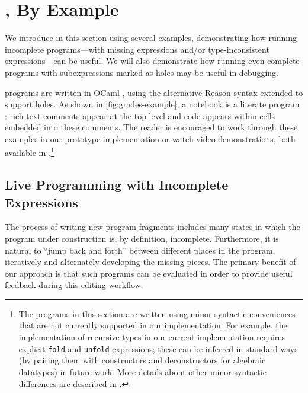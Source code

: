\newcommand{\examplesSec}{\HazelnutLive, By Example}
\section{\protect\examplesSec} %
\label{sec:examples}

\newcommand{\overviewExample}[2]{\paragraph{Example {#1}: {#2}}}

We introduce \HazelnutLive{} in this section using several examples,
demonstrating how running incomplete programs---with missing expressions and/or
type-inconsistent expressions---can be useful.
%
We will also demonstrate how running even complete programs with subexpressions
marked as holes may be useful in debugging.

\HazelnutLive{} programs are written in OCaml \cite{leroy03:_ocaml}, using the
alternative Reason syntax \cite{reason-what} extended to support holes.
%
As shown in \autoref{fig:grades-example}, a \HazelnutLive{} notebook is a
literate program \cite{knuth1984literate}: rich text comments appear at the top
level and code appears within cells embedded into these comments.
%
The reader is encouraged to work through these examples in our prototype
implementation or watch video demonstrations, both available in
\suppMaterials{}.\footnote{
%
The programs in this section are written using minor syntactic conveniences that
are not currently supported in our implementation.
%
For example, the implementation of recursive types in our current implementation
requires explicit \texttt{fold} and \texttt{unfold} expressions; these can be
inferred in standard ways (by pairing them with constructors and deconstructors
for algebraic datatypes) in future work.
%
More details about other minor syntactic differences are described in
\suppMaterials{}.
%
}


\subsection{Live Programming with Incomplete Expressions}

The process of writing new program fragments includes many states in which the
program under construction is, by definition, incomplete.
%
Furthermore, it is natural to ``jump back and forth'' between different places
in the program, iteratively and alternately developing the missing pieces.
%
The primary benefit of our approach is that such programs can be evaluated in
order to provide useful feedback during this editing workflow.

